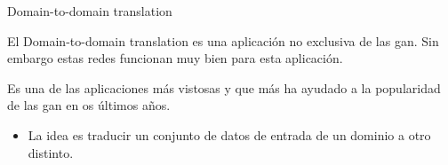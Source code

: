 \begin{frame}{Domain-to-domain translation}

    El \alert{Domain-to-domain translation} es una aplicación \alert{no exclusiva} de las \gls{gan}. Sin embargo estas redes funcionan muy bien para esta aplicación.
    
    Es una de las aplicaciones \alert{más vistosas} y que más ha ayudado a la popularidad de las \gls{gan} en os últimos años.
    
    \begin{itemize}
        \item La idea es traducir un conjunto de datos de entrada de \alert{un dominio a otro distinto}.
    \end{itemize}

\end{frame}

